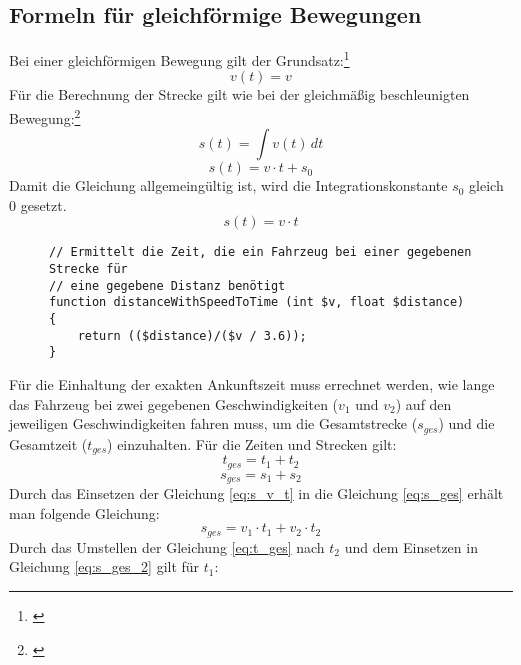 \subsection{Formeln für gleichförmige Bewegungen} \label{formulaGleichfoermig}
Bei einer gleichförmigen Bewegung gilt der Grundsatz:\footnote{\citet[S. 22]{richard2011technische}}
\begin{equation}
v(t) = v
\end{equation}
Für die Berechnung der Strecke gilt wie bei der gleichmäßig beschleunigten Bewegung:\footnote{\citet[S. 20]{richard2011technische}}
\begin{equation}
s(t) = \int v(t) \,dt
\end{equation}
\begin{equation}
s(t) =v \cdot t + s_{0}
\end{equation}
Damit die Gleichung allgemeingültig ist, wird die Integrationskonstante $s_{0}$ gleich 0 gesetzt.
\begin{equation}
s(t) =v \cdot t
\label{eq:s_v_t}
\end{equation}
\begin{figure}[H]
\begin{lstlisting}[caption={\textit{distanceWithSpeedToTime$($$)$} (\textit{functions\_math.php})},captionpos=b,label={lst:distanceWithSpeedToTime}]
// Ermittelt die Zeit, die ein Fahrzeug bei einer gegebenen Strecke für
// eine gegebene Distanz benötigt
function distanceWithSpeedToTime (int $v, float $distance) {
	return (($distance)/($v / 3.6));
}
\end{lstlisting}
\end{figure}
\noindent Für die Einhaltung der exakten Ankunftszeit muss errechnet werden, wie lange das Fahrzeug bei zwei gegebenen Geschwindigkeiten ($v_1$ und $v_2$) auf den jeweiligen Geschwindigkeiten fahren muss, um die Gesamtstrecke ($s_{ges}$) und die Gesamtzeit ($t_{ges}$) einzuhalten. Für die Zeiten und Strecken gilt:
\begin{equation}
\label{eq:t_ges}
t_{ges} = t_{1} + t_{2}
\end{equation}
\begin{equation}
\label{eq:s_ges}
s_{ges} = s_{1} + s_{2}
\end{equation}
Durch das Einsetzen der Gleichung \eqref{eq:s_v_t} in die Gleichung \eqref{eq:s_ges} erhält man folgende Gleichung:
\begin{equation}
\label{eq:s_ges_2}
s_{ges} = v_{1} \cdot t_{1} + v_{2} \cdot t_{2}
\end{equation}
Durch das Umstellen der Gleichung \eqref{eq:t_ges} nach $t_{2}$ und dem Einsetzen in Gleichung \eqref{eq:s_ges_2} gilt für $t_{1}$:
